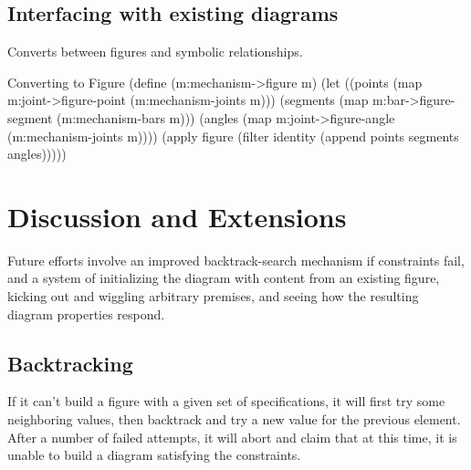 \subsection{Interfacing with existing diagrams}

Converts between figures and symbolic relationships.

\begin{code-listing}
[label=to-figure]
{Converting to Figure}
(define (m:mechanism->figure m)
  (let ((points (map m:joint->figure-point (m:mechanism-joints m)))
        (segments (map m:bar->figure-segment (m:mechanism-bars m)))
        (angles (map m:joint->figure-angle (m:mechanism-joints m))))
    (apply figure (filter identity (append points segments angles)))))
\end{code-listing}

\section{Discussion and Extensions}

Future efforts involve an improved backtrack-search mechanism if
constraints fail, and a system of initializing the diagram with
content from an existing figure, kicking out and wiggling arbitrary
premises, and seeing how the resulting diagram properties respond.

\subsection{Backtracking}

If it can't build a figure with a given set of specifications, it will
first try some neighboring values, then backtrack and try a new value
for the previous element. After a number of failed attempts, it will
abort and claim that at this time, it is unable to build a diagram
satisfying the constraints.
